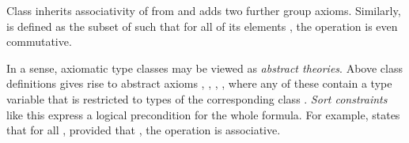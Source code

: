 \begin{isabellebody}
\begin{isamarkuptext}%
\noindent Class  inherits associativity of \isa{{\isasymodot}}
  from  and adds two further group axioms. Similarly,
   is defined as the subset of  such that
  for all of its elements \isa{{\isasymtau}}, the operation \isa{{\isasymodot}\ {\isasymColon}\ {\isasymtau}\ {\isasymRightarrow}\ {\isasymtau}\ {\isasymRightarrow}\ {\isasymtau}} is even commutative.%
\end{isamarkuptext}%
\isamarkuptrue%
%
\isamarkuptrue%
%
\begin{isamarkuptext}%
In a sense, axiomatic type classes may be viewed as \emph{abstract
  theories}.  Above class definitions gives rise to abstract axioms
  , , , , where any of these contain a type variable  that is restricted to types of the corresponding class .  \emph{Sort constraints} like this express a logical
  precondition for the whole formula.  For example, 
  states that for all \isa{{\isasymtau}}, provided that , the operation \isa{{\isasymodot}\ {\isasymColon}\ {\isasymtau}\ {\isasymRightarrow}\ {\isasymtau}\ {\isasymRightarrow}\ {\isasymtau}} is associative.


\end{isamarkuptext}
\end{isabellebody}

